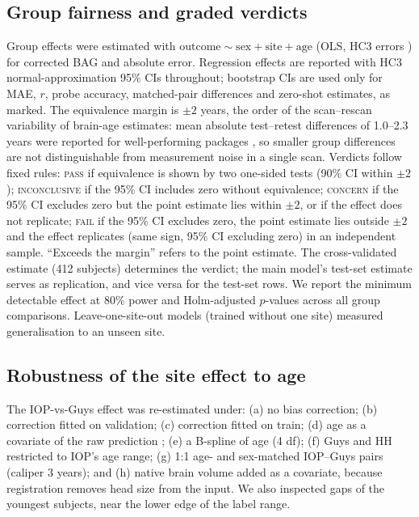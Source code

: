 \documentclass[conference]{IEEEtran}
\begin{document}
\subsection{Group fairness and graded verdicts}
Group effects were estimated with $\mathrm{outcome}\sim\mathrm{sex}+\mathrm{site}+\mathrm{age}$ (OLS, HC3 errors \cite{mackinnon1985hc}) for corrected BAG and absolute error. Regression effects are reported with HC3 normal-approximation 95\% CIs throughout; bootstrap CIs \cite{efron1993bootstrap} are used only for MAE, $r$, probe accuracy, matched-pair differences and zero-shot estimates, as marked. The equivalence margin is $\pm2$ years, the order of the scan--rescan variability of brain-age estimates: mean absolute test--retest differences of 1.0--2.3 years were reported for well-performing packages \cite{dorfel2023testretest}, so smaller group differences are not distinguishable from measurement noise in a single scan. Verdicts follow fixed rules: \textsc{pass} if equivalence is shown by two one-sided tests \cite{schuirmann1987tost} (90\% CI within $\pm2$); \textsc{inconclusive} if the 95\% CI includes zero without equivalence; \textsc{concern} if the 95\% CI excludes zero but the point estimate lies within $\pm2$, or if the effect does not replicate; \textsc{fail} if the 95\% CI excludes zero, the point estimate lies outside $\pm2$ and the effect replicates (same sign, 95\% CI excluding zero) in an independent sample. ``Exceeds the margin'' refers to the point estimate. The cross-validated estimate (412 subjects) determines the verdict; the main model's test-set estimate serves as replication, and vice versa for the test-set rows. We report the minimum detectable effect at 80\% power and Holm-adjusted \cite{holm1979} $p$-values across all group comparisons. Leave-one-site-out models (trained without one site) measured generalisation to an unseen site.

\subsection{Robustness of the site effect to age}
\label{sec:agemethods}
The IOP-vs-Guys effect was re-estimated under: (a) no bias correction; (b) correction fitted on validation; (c) correction fitted on train; (d) age as a covariate of the raw prediction \cite{le2018nonlinear}; (e) a B-spline of age (4 df); (f) Guys and HH restricted to IOP's age range; (g) 1:1 age- and sex-matched IOP--Guys pairs (caliper 3 years); and (h) native brain volume added as a covariate, because registration removes head size from the input. We also inspected gaps of the youngest subjects, near the lower edge of the label range.
\end{document}

